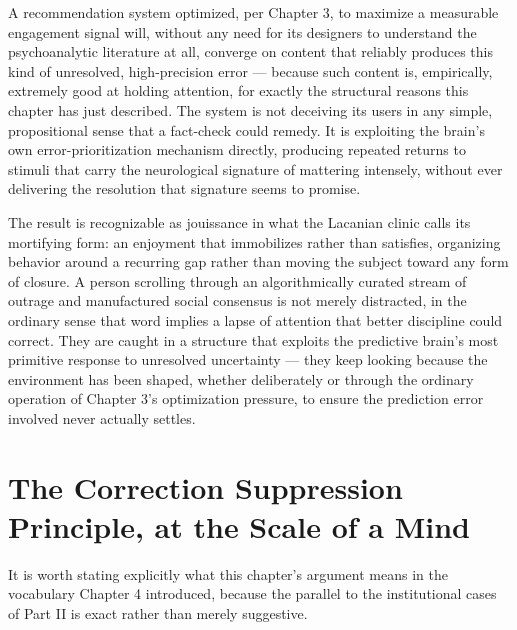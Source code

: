 \documentclass[12pt,a4paper]{book}
\begin{document}
A recommendation system optimized, per Chapter 3, to maximize a measurable engagement signal will, without any need for its designers to understand the psychoanalytic literature at all, converge on content that reliably produces this kind of unresolved, high-precision error — because such content is, empirically, extremely good at holding attention, for exactly the structural reasons this chapter has just described. The system is not deceiving its users in any simple, propositional sense that a fact-check could remedy. It is exploiting the brain's own error-prioritization mechanism directly, producing repeated returns to stimuli that carry the neurological signature of mattering intensely, without ever delivering the resolution that signature seems to promise.

The result is recognizable as jouissance in what the Lacanian clinic calls its mortifying form: an enjoyment that immobilizes rather than satisfies, organizing behavior around a recurring gap rather than moving the subject toward any form of closure. A person scrolling through an algorithmically curated stream of outrage and manufactured social consensus is not merely distracted, in the ordinary sense that word implies a lapse of attention that better discipline could correct. They are caught in a structure that exploits the predictive brain's most primitive response to unresolved uncertainty — they keep looking because the environment has been shaped, whether deliberately or through the ordinary operation of Chapter 3's optimization pressure, to ensure the prediction error involved never actually settles.

\section{The Correction Suppression Principle, at the Scale of a Mind}

It is worth stating explicitly what this chapter's argument means in the vocabulary Chapter 4 introduced, because the parallel to the institutional cases of Part II is exact rather than merely suggestive.
\end{document}
